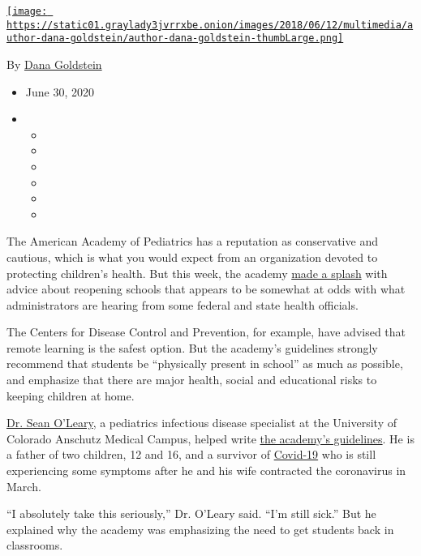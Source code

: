 \href{https://www.nytimes3xbfgragh.onion/by/dana-goldstein}{\texttt{[image: https://static01.graylady3jvrrxbe.onion/images/2018/06/12/multimedia/author-dana-goldstein/author-dana-goldstein-thumbLarge.png]}}

By \href{https://www.nytimes3xbfgragh.onion/by/dana-goldstein}{Dana
Goldstein}

\begin{itemize}
\item
  June 30, 2020
\item
  \begin{itemize}
  \item
  \item
  \item
  \item
  \item
  \item
  \end{itemize}
\end{itemize}

The American Academy of Pediatrics has a reputation as conservative and
cautious, which is what you would expect from an organization devoted to
protecting children's health. But this week, the academy
\href{https://twitter.com/DanaGoldstein/status/1277566240526123008}{made
a splash} with advice about reopening schools that appears to be
somewhat at odds with what administrators are hearing from some federal
and state health officials.

The Centers for Disease Control and Prevention, for example, have
advised that remote learning is the safest option. But the academy's
guidelines strongly recommend that students be ``physically present in
school'' as much as possible, and emphasize that there are major health,
social and educational risks to keeping children at home.

\href{https://www.cudoctors.com/Find_A_Doctor/Profile/8599}{Dr. Sean
O'Leary}, a pediatrics infectious disease specialist at the University
of Colorado Anschutz Medical Campus, helped write
\href{https://services.aap.org/en/pages/2019-novel-coronavirus-covid-19-infections/clinical-guidance/covid-19-planning-considerations-return-to-in-person-education-in-schools/}{the
academy's guidelines}. He is a father of two children, 12 and 16, and a
survivor of
\href{https://www.nytimes3xbfgragh.onion/news-event/coronavirus}{Covid-19}
who is still experiencing some symptoms after he and his wife contracted
the coronavirus in March.

``I absolutely take this seriously,'' Dr. O'Leary said. ``I'm still
sick.'' But he explained why the academy was emphasizing the need to get
students back in classrooms.

